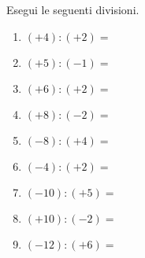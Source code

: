 \begin{esercizio}
\label{ese:2.19}
 Esegui le seguenti divisioni.
 
\vspace{-1em}
\begin{multicols}{3}
 \begin{enumerate}[noitemsep, label=(\alph*)]
 \item \((+4):(+2) =\)
 \item \((+5):(-1) =\)
 \item \((+6):(+2) =\)
 \item \((+8):(-2) =\)
 \item \((-8):(+4) =\)
 \item \((-4):(+2) =\)
 \item \((-10):(+5) =\)
 \item \((+10):(-2) =\)
 \item \((-12):(+6) =\)
 \end{enumerate}
 \end{multicols}
\end{esercizio}

% 

